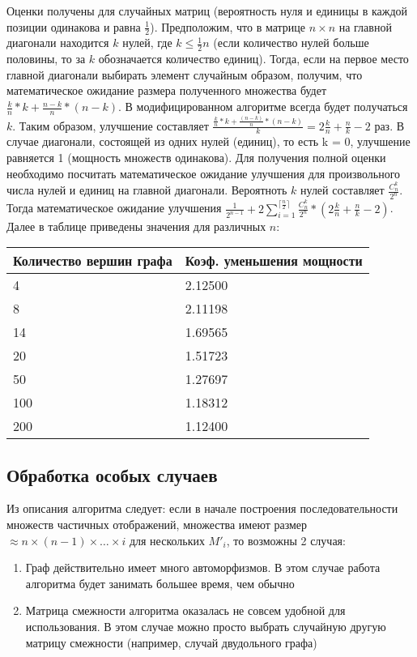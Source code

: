 Оценки получены для случайных матриц (вероятность нуля и единицы в каждой позиции
одинакова и равна $\frac{1}{2}$).
Предположим, что в матрице $n\times n$ на главной диагонали находится $k$ нулей, где $k \leq \frac{1}{2} n$ (если количество нулей больше половины, то за $k$ обозначается количество единиц).
Тогда, если на первое место главной диагонали выбирать элемент случайным образом,
получим, что математическое ожидание размера полученного множества будет $\frac{k}{n}*k + \frac{n-k}{n}*(n-k)$.
В модифицированном алгоритме всегда будет получаться $k$. Таким образом,
улучшение составляет $\frac{\frac{k}{n} * k + \frac{(n-k)}{n} * (n-k)} {k} = 2 \frac{k}{n} + \frac{n}{k} - 2$ раз. В случае диагонали,
состоящей из одних нулей (единиц), то есть k = 0, улучшение равняется 1 (мощность
множеств одинакова).
Для получения полной оценки необходимо посчитать математическое ожидание улучшения для
произвольного числа нулей и единиц на главной диагонали. Вероятноть $k$ нулей
составляет $\frac{C_n^k}{2^n}$. Тогда математическое ожидание улучшения $\frac{1}{2^{n-1}} + 2 \sum\limits_{i=1}^{\lceil\frac{n}{2}\rceil} \frac{C_n^k}{2^n} * (2\frac{k}{n} + \frac{n}{k} - 2)$.
Далее в таблице приведены значения для различных $n$:

\begin{tabular}[t]{||l|l||}
\hline
Количество вершин графа & Коэф. уменьшения мощности \\
\hline
4 &  2.12500 \\
\hline
8 & 2.11198 \\
\hline
14 & 1.69565 \\
\hline
20 & 1.51723 \\
\hline
50 & 1.27697 \\
\hline
100 & 1.18312 \\
\hline
200 & 1.12400 \\
\hline
\end{tabular}

\subsection{Обработка особых случаев}
Из описания алгоритма следует: если в начале построения последовательности множеств частичных отображений, множества имеют размер $\approx n \times (n-1) \times \ldots \times i$ для нескольких $M'_i$, то возможны 2 случая:

\begin{enumerate}
\item Граф действительно имеет много автоморфизмов. В этом случае работа алгоритма будет занимать большее время, чем обычно 

\item Матрица смежности алгоритма оказалась не совсем удобной для использования. В этом случае можно просто выбрать случайную другую матрицу смежности (например, случай двудольного графа)
\end{enumerate} 


